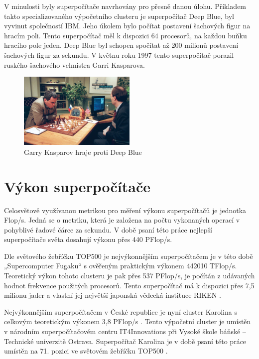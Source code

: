 V minulosti byly superpočítače navrhovány pro přesně danou úlohu. Příkladem takto specializovaného výpočetního clusteru je superpočítač Deep Blue, byl vyvinut společností IBM. Jeho úkolem bylo počítat postavení šachových figur na hracím poli. Tento superpočítač měl k dispozici 64 procesorů, na každou buňku hracího pole jeden. Deep Blue byl schopen spočítat až 200 milionů postavení šachových figur za sekundu. V květnu roku 1997 tento superpočítač porazil ruského šachového velmistra Garri Kasparova.\cite{Hosch20191128}

\begin{figure}[h]
	\centering
	\includegraphics[width=0.5\textwidth]{Figures/Garry-Kasparov-playing-against-Deep-Blue.jpeg}
	\caption{Garry Kasparov hraje proti Deep Blue \cite{Hosch20191128}}
	\label{fig:garry-kasparov}
\end{figure}

\section{Výkon superpočítače}
Celosvětově využívanou metrikou pro měření výkonu superpočítačů je jednotka Flop/s. Jedná se o metriku, která je založena na počtu vykonaných operací v pohyblivé řadové čárce za sekundu. V době psaní této práce nejlepší superpočítače světa dosahují výkonu přes 440 PFlop/s.

Dle světového žebříčku TOP500 je nejvýkonnějším superpočítačem je v této době 
„Supercomputer Fugaku“ s ověřeným praktickým výkonem 442010 TFlop/s. Teoretický výkon tohoto clusteru je pak přes 537 PFlop/s, je počítán z udávaných hodnot frekvence použitých procesorů. Tento superpočítač má k dispozici přes 7,5 milionu jader a vlastní jej největší japonská vědecká instituce RIKEN \cite{B2TvJy8L3mSIxfWp}.

Nejvýkonnějším superpočítačem v České republice je nyní cluster Karolina s celkovým teoretickým výkonem 3,8 PFlop/s \cite{oviOzaWRPKlKSq7K}. Tento výpočetní cluster je umístěn v národním superpočítačovém centru IT4Innovations při Vysoké škole báňské – Technické univerzitě Ostrava. Superpočítač Karolina je v době psaní této práce umístěn na 71. pozici ve světovém žebříčku TOP500 \cite{iqgLoV1cXM0Qb6t1}.

